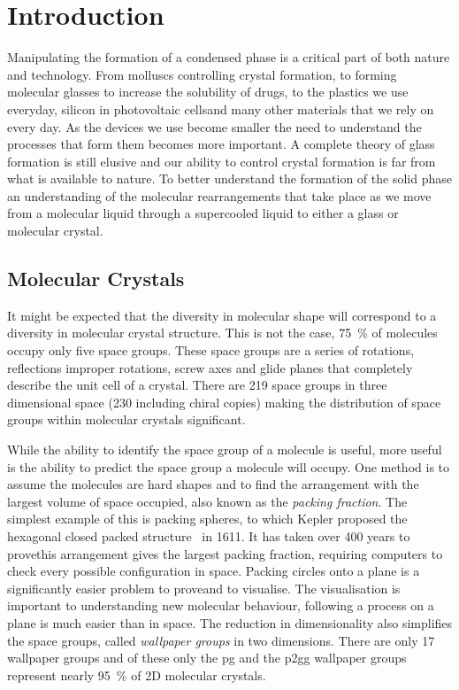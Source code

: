 
\chapter{Introduction}


Manipulating the formation of a condensed phase is a critical part of both nature and technology. From molluscs controlling crystal formation\tocite, to forming molecular glasses to increase the solubility of drugs\tocite, to the plastics we use everyday\tocite, silicon in photovoltaic cells\tocite and many other materials that we rely on every day. As the devices we use become smaller the need to understand the processes that form them becomes more important. A complete theory of glass formation is still elusive and our ability to control crystal formation is far from what is available to nature. To better understand the formation of the solid phase an understanding of the molecular rearrangements that take place as we move from a molecular liquid through a supercooled liquid to either a glass or molecular crystal.

\section{Molecular Crystals}

It might be expected that the diversity in molecular shape will correspond to a diversity in molecular crystal structure. This is not the case, \SI{75}{\percent} of molecules occupy only five space groups\tocite. These space groups are a series of rotations, reflections improper rotations, screw axes and glide planes that completely describe the unit cell of a crystal. There are 219 space groups in three dimensional space (230 including chiral copies) making the distribution of space groups within molecular crystals significant.

While the ability to identify the space group of a molecule is useful, more useful is the ability to predict the space group a molecule will occupy. One method is to assume the molecules are hard shapes and to find the arrangement with the largest volume of space occupied\tocite, also known as the \emph{packing fraction}. The simplest example of this is packing spheres, to which Kepler proposed the hexagonal closed packed structure~\figref{} in 1611\tocite. It has taken over 400 years to prove\tocite this arrangement gives the largest packing fraction, requiring computers to check every possible configuration in space. Packing circles onto a plane is a significantly easier problem to prove\tocite and to visualise\figref{}. The visualisation is important to understanding new molecular behaviour, following a process on a plane is much easier than in space. The reduction in dimensionality also simplifies the space groups, called \emph{wallpaper groups} in two dimensions. There are only 17 wallpaper groups\figref{} and of these only the pg and the p2gg wallpaper groups represent nearly \SI{95}{\percent} of 2D molecular crystals\tocite.

